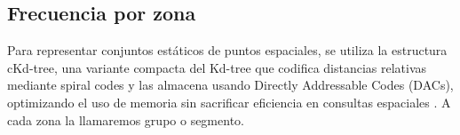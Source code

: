 \documentclass[12pt]{article}
\begin{document}

\subsection{Frecuencia por zona}
Para representar conjuntos estáticos de puntos espaciales, se utiliza la estructura cKd-tree, una variante compacta del Kd-tree que codifica distancias relativas mediante spiral codes y las almacena usando Directly Addressable Codes (DACs), optimizando el uso de memoria sin sacrificar eficiencia en consultas espaciales \parencite{gutierrez2023ckdtree}. A cada zona la llamaremos grupo o segmento.












\printbibliography
\end{document}
